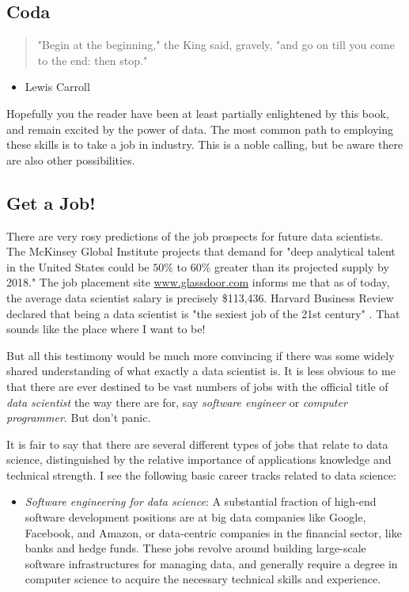 \documentclass[10pt]{article}
\begin{document}
\begin{enumerate}
\chapter{Coda}
\begin{quotation}
"Begin at the beginning," the King said, gravely, "and go on till you come to the end: then stop."
\end{quotation}

\begin{itemize}
  \item Lewis Carroll
\end{itemize}

Hopefully you the reader have been at least partially enlightened by this book, and remain excited by the power of data. The most common path to employing these skills is to take a job in industry. This is a noble calling, but be aware there are also other possibilities.

\section{Get a Job!}
There are very rosy predictions of the job prospects for future data scientists. The McKinsey Global Institute projects that demand for "deep analytical talent in the United States could be $50\%$ to $60\%$ greater than its projected supply by 2018." The job placement site \href{http://www.glassdoor.com}{www.glassdoor.com} informs me that as of today, the average data scientist salary is precisely \$113,436. Harvard Business Review declared that being a data scientist is "the sexiest job of the 21st century" \cite{DP12}. That sounds like the place where I want to be!

But all this testimony would be much more convincing if there was some widely shared understanding of what exactly a data scientist is. It is less obvious to me that there are ever destined to be vast numbers of jobs with the official title of \textit{data scientist} the way there are for, say \textit{software engineer} or \textit{computer programmer}. But don't panic.

It is fair to say that there are several different types of jobs that relate to data science, distinguished by the relative importance of applications knowledge and technical strength. I see the following basic career tracks related to data science:

\begin{itemize}
  \item \textit{Software engineering for data science}: A substantial fraction of high-end software development positions are at big data companies like Google, Facebook, and Amazon, or data-centric companies in the financial sector, like banks and hedge funds. These jobs revolve around building large-scale software infrastructures for managing data, and generally require a degree in computer science to acquire the necessary technical skills and experience.


\end{itemize}
\end{enumerate}
\end{document}
